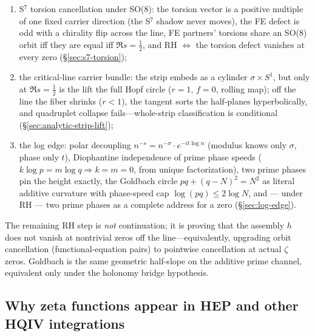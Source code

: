 \documentclass[11pt]{amsart}
\begin{document}
\begin{enumerate}[label=(\roman*),nosep]
      provably commutative and normal (the formal reason the diagonal
      attack saturates), while the non-associative carrier escapes —
      the triple $(e_1,e_2,e_4)$ has $[e_1,e_2,e_4]=-e_3-e_4\neq0$ on the
      frozen Fano tables, prime spectral weights ride the associator
      trilinearly, the channel $2(abc)^{-2\sigma}$ never vanishes
      (zeros kill the abelian assembly, never the torsion), and RH
      $\Leftrightarrow$ square-root torsion weight at every zero
      (\S\ref{sec:associator-channel});
\item S$^7$ torsion cancellation under SO(8): the torsion vector is a
      positive multiple of one fixed carrier direction (the S$^7$ shadow
      never moves), the FE defect is odd with a chirality flip across the
      line, FE partners' torsions share an SO(8) orbit iff they are
      equal iff $\Re s=\tfrac12$, and RH $\Leftrightarrow$ the torsion
      defect vanishes at every zero
      (\S\ref{sec:s7-torsion});
\item the critical-line carrier bundle: the strip embeds as a cylinder
      $\sigma\times S^1$, but only at $\Re s=\tfrac12$ is the lift the full
      Hopf circle ($r=1$, $f=0$, rolling map); off the line the fiber shrinks
      ($r<1$), the tangent sorts the half-planes hyperbolically, and
      quadruplet collapse fails---whole-strip classification is conditional
      (\S\ref{sec:analytic-strip-lift});
\item the log edge: polar decoupling
      $n^{-s}=n^{-\sigma}\cdot e^{-it\log n}$ (modulus knows only
      $\sigma$, phase only $t$), Diophantine independence of prime
      phase speeds ($k\log p=m\log q\Rightarrow k=m=0$, from unique
      factorization), two prime phases pin the height exactly, the
      Goldbach circle $pq+(q-N)^2=N^2$ as literal additive curvature
      with phase-speed cap $\log(pq)\le2\log N$, and — under RH — two
      prime phases as a complete address for a zero
      (\S\ref{sec:log-edge}).
\end{enumerate}
The remaining RH step is \emph{not} continuation; it is proving that the assembly
$h$ does not vanish at nontrivial zeros off the line---equivalently, upgrading
orbit cancellation (functional-equation pairs) to pointwise cancellation at
actual $\zeta$ zeros.  Goldbach is the same geometric half-slope on the additive
prime channel, equivalent only under the holonomy bridge hypothesis.

\subsection{Why zeta functions appear in HEP and other HQIV integrations}
\label{sec:hep-zeta-bridge}
\end{document}
